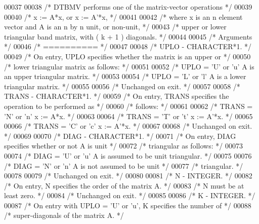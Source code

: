 \begin{DoxyCode}
00037 
00038 \textcolor{comment}{/*  DTBMV  performs one of the matrix-vector operations */}
00039 
00040 \textcolor{comment}{/*     x := A*x,   or   x := A'*x, */}
00041 
00042 \textcolor{comment}{/*  where x is an n element vector and  A is an n by n unit, or non-unit, */}
00043 \textcolor{comment}{/*  upper or lower triangular band matrix, with ( k + 1 ) diagonals. */}
00044 
00045 \textcolor{comment}{/*  Arguments */}
00046 \textcolor{comment}{/*  ========== */}
00047 
00048 \textcolor{comment}{/*  UPLO   - CHARACTER*1. */}
00049 \textcolor{comment}{/*           On entry, UPLO specifies whether the matrix is an upper or */}
00050 \textcolor{comment}{/*           lower triangular matrix as follows: */}
00051 
00052 \textcolor{comment}{/*              UPLO = 'U' or 'u'   A is an upper triangular matrix. */}
00053 
00054 \textcolor{comment}{/*              UPLO = 'L' or 'l'   A is a lower triangular matrix. */}
00055 
00056 \textcolor{comment}{/*           Unchanged on exit. */}
00057 
00058 \textcolor{comment}{/*  TRANS  - CHARACTER*1. */}
00059 \textcolor{comment}{/*           On entry, TRANS specifies the operation to be performed as */}
00060 \textcolor{comment}{/*           follows: */}
00061 
00062 \textcolor{comment}{/*              TRANS = 'N' or 'n'   x := A*x. */}
00063 
00064 \textcolor{comment}{/*              TRANS = 'T' or 't'   x := A'*x. */}
00065 
00066 \textcolor{comment}{/*              TRANS = 'C' or 'c'   x := A'*x. */}
00067 
00068 \textcolor{comment}{/*           Unchanged on exit. */}
00069 
00070 \textcolor{comment}{/*  DIAG   - CHARACTER*1. */}
00071 \textcolor{comment}{/*           On entry, DIAG specifies whether or not A is unit */}
00072 \textcolor{comment}{/*           triangular as follows: */}
00073 
00074 \textcolor{comment}{/*              DIAG = 'U' or 'u'   A is assumed to be unit triangular. */}
00075 
00076 \textcolor{comment}{/*              DIAG = 'N' or 'n'   A is not assumed to be unit */}
00077 \textcolor{comment}{/*                                  triangular. */}
00078 
00079 \textcolor{comment}{/*           Unchanged on exit. */}
00080 
00081 \textcolor{comment}{/*  N      - INTEGER. */}
00082 \textcolor{comment}{/*           On entry, N specifies the order of the matrix A. */}
00083 \textcolor{comment}{/*           N must be at least zero. */}
00084 \textcolor{comment}{/*           Unchanged on exit. */}
00085 
00086 \textcolor{comment}{/*  K      - INTEGER. */}
00087 \textcolor{comment}{/*           On entry with UPLO = 'U' or 'u', K specifies the number of */}
00088 \textcolor{comment}{/*           super-diagonals of the matrix A. */}

\end{DoxyCode}

